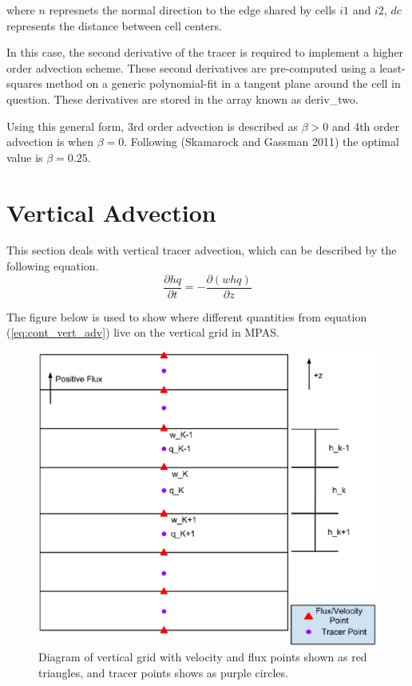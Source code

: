 \documentclass[11pt]{report}
\begin{document}
where $n$ represnets the normal direction to the edge shared by cells $i1$ and $i2$, $dc$ represents the distance between cell centers.

In this case, the second derivative of the tracer is required to implement a higher order advection scheme. These second derivatives are pre-computed using a least-squares method on a generic polynomial-fit in a tangent plane around the cell in question. These derivatives are stored in the array known as deriv\_two.

Using this general form, 3rd order advection is described as $\beta > 0$ and 4th order advection is when $\beta = 0$. Following (Skamarock and Gassman 2011) the optimal value is $\beta = 0.25$.

\section{Vertical Advection}
This section deals with vertical tracer advection, which can be described by the following equation.
\begin{equation}
	\frac{\partial h q}{\partial t} = - \frac{\partial (w h q)}{\partial z}
	\label{eq:cont_vert_adv}
\end{equation}

The figure below is used to show where different quantities from equation (\ref{eq:cont_vert_adv}) live on the vertical grid in MPAS.
\begin{figure}[H]
	\center
	\includegraphics[scale=0.5]{VerticalFluxDiagram.eps}
	\caption{Diagram of vertical grid with velocity and flux points shown as red triangles, and tracer points shows as purple circles.}
	\label{fig:vert_flux_diagram}
\end{figure}
\end{document}
